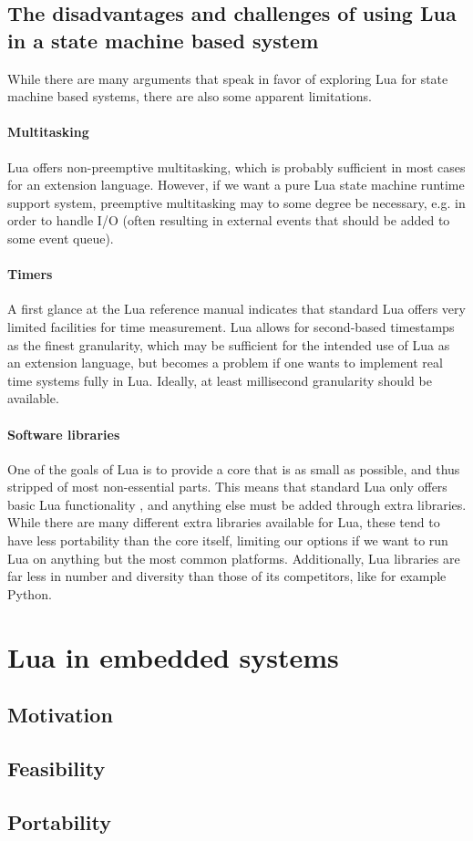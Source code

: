 \subsection{The disadvantages and challenges of using Lua in a state machine based system}
\label{sec:lua_disadvantages}
While there are many arguments that speak in favor of exploring Lua for state machine based systems, there are also some apparent limitations.

\paragraph{Multitasking}
Lua offers non-preemptive multitasking, which is probably sufficient in most cases for an extension language. However, if we want a pure Lua state machine runtime support system, preemptive multitasking may to some degree be necessary, e.g. in order to handle I/O (often resulting in external events that should be added to some event queue).

\paragraph{Timers}
A first glance at the Lua reference manual indicates that standard Lua offers very limited facilities for time measurement. Lua allows for second-based timestamps as the finest granularity, which may be sufficient for the intended use of Lua as an extension language, but becomes a problem if one wants to implement real time systems fully in Lua. Ideally, at least millisecond granularity should be available.

\paragraph{Software libraries}
One of the goals of Lua is to provide a core that is as small as possible, and thus stripped of most non-essential parts. This means that standard Lua only offers basic Lua functionality \cite[ch. 6]{manual:lua_reference_manual}, and anything else must be added through extra libraries. While there are many different extra libraries available for Lua, these tend to have less portability than the core itself, limiting our options if we want to run Lua on anything but the most common platforms. Additionally, Lua libraries are far less in number and diversity than those of its competitors, like for example Python.

\section{Lua in embedded systems}
\label{ch:lua_in_embedded}

\subsection{Motivation}


\subsection{Feasibility}


\subsection{Portability}